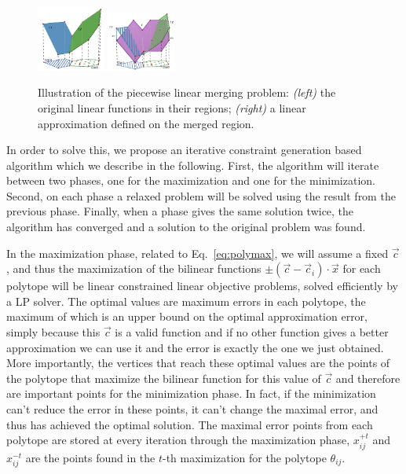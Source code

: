 \begin{figure}[t!]
\center
\includegraphics[trim = 2cm 0cm 2cm 0cm, height=0.25\textwidth,width=0.2\textwidth]{Figures/optimDiag/optdiagram1.pdf} 
\hspace{2mm}
\includegraphics[trim = 2cm 0cm 2cm 0cm, height=0.25\textwidth,width=0.2\textwidth]{Figures/optimDiag/optdiagram2.pdf}
\caption{Illustration of the piecewise linear merging problem: \emph{(left)} the original linear functions in their regions; \emph{(right)} a linear approximation defined on the merged region.}
\label{fig:optim} 
\end{figure}

In order to solve this, we propose an iterative constraint generation based algorithm which we describe in the following. First, the algorithm will iterate between two phases, one for the maximization and one for the minimization.  Second, on each phase a relaxed problem will be solved using the result from the previous phase. Finally, when a phase gives the same solution twice, the algorithm has converged and a solution to the original problem was found.

In the maximization phase, related to Eq.~\ref{eq:polymax}, we will assume a fixed $\vec{c}$, and thus the maximization of the bilinear functions $\pm(\vec{c} - \vec{c}_i)\cdot \vec{x}$ for each polytope will be linear constrained linear objective problems, solved efficiently by a LP solver. The optimal values are maximum errors in each polytope, the maximum of which is an upper bound on the optimal approximation error, simply because this $\vec{c}$ is a valid function and if no other function gives a better approximation we can use it and the error is exactly the one we just obtained. More importantly, the vertices that reach these optimal values are the points of the polytope that maximize the bilinear function for this value of $\vec{c}$ and therefore are important points for the minimization phase. In fact, if the minimization can't reduce the error in these points, it can't change the maximal error, and thus has achieved the optimal solution. The maximal error points from each polytope are stored at every iteration through the maximization phase, $x^{+t}_{ij}$ and $x^{-t}_{ij}$ are the points found in the $t$-th maximization for the polytope $\theta_{ij}$. 

